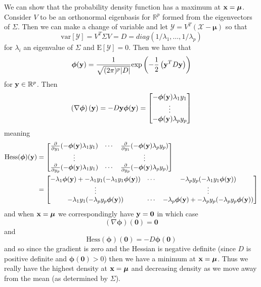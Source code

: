 \documentclass{book}
\newcommand{\bs}[1]{\boldsymbol{#1}}
\newcommand{\rv}[1]{\bs{\mathscr{#1}}}
\newcommand{\e}[1]{\text{E}\left[#1\right]}
\begin{document}
We can show that the probability density function has a maximum at ${\bf x}=\bs{\mu}$. Consider $V$ to be an orthonormal eigenbasis for $\mathbb{R}^p$ formed from the eigenvectors of $\Sigma$. Then we can make a change of variable and let $\rv{Y}=V^T(\rv{X}-\bs{\mu})$ so that 
$$
\text{var}\left[\rv{Y}\right]=V^T\Sigma V=D=diag(1/\lambda_1,\ldots,1/\lambda_p)
$$
for $\lambda_i$ an eigenvalue of $\Sigma$ and $\e{\mathscr{Y}}=0$. Then we have that 
$$
\bs{\phi}({\bf y})=\frac{1}{\sqrt{(2\pi)^p|D|}}\text{exp}\left(-\frac{1}{2}\left({\bf y}^TD{\bf y}\right)\right)
$$
for ${\bf y}\in\mathbb{R}^p$. Then
$$
\left(\nabla \bs{\phi}\right)({\bf y})=-D{\bf y}\bs{\phi}({\bf y})=
\begin{bmatrix}
-\bs{\phi}({\bf y})\lambda_1y_1\\
\vdots\\
-\bs{\phi}({\bf y})\lambda_py_p
\end{bmatrix}
$$
meaning 
$$
\begin{aligned}
\text{Hess}(\bs{\phi})({\bf y})&=
\begin{bmatrix}
\frac{\partial}{\partial y_1} (-\bs{\phi}({\bf y})\lambda_1y_1)& \cdots& \frac{\partial}{\partial y_1} (-\bs{\phi}({\bf y})\lambda_py_p)\\
\vdots& & \vdots\\
\frac{\partial}{\partial y_p} (-\bs{\phi}({\bf y})\lambda_1y_1)& \cdots& \frac{\partial}{\partial y_p} (-\bs{\phi}({\bf y})\lambda_py_p)\\
\end{bmatrix}\\
&=
\begin{bmatrix}
-\lambda_1\bs{\phi}({\bf y})+-\lambda_1y_1(-\lambda_1y_1\bs{\phi}({\bf y}))& \cdots& -\lambda_py_p(-\lambda_1y_1\bs{\phi}({\bf y}))\\
\vdots& & \vdots\\
-\lambda_1y_1(-\lambda_py_p\bs{\phi}({\bf y}))& \cdots& -\lambda_p\bs{\phi}({\bf y})+-\lambda_py_p(-\lambda_py_p\bs{\phi}({\bf y}))
\end{bmatrix}
\end{aligned}
$$
and when ${\bf x}=\bs{\mu}$ we correspondingly have ${\bf y}=\bs{0}$ in which case
$$
\left(\nabla \bs{\phi}\right)(\bs{0})=\bs{0}
$$
and
$$
\text{Hess}(\bs{\phi})(\bs{0})=-D\bs{\phi}(\bs{0})
$$
and so since the gradient is zero and the Hessian is negative definite (since $D$ is positive definite and $\bs{\phi}(\bs{0})>0$) then we have a minimum at ${\bf x}=\bs{\mu}$. Thus we really have the highest density at ${\bf x}=\bs{\mu}$ and decreasing density as we move away from the mean (as determined by $\Sigma$).
\end{document}
